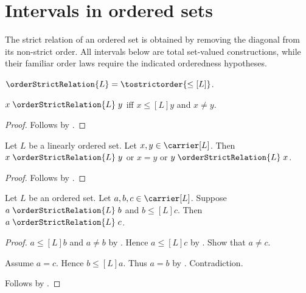 \section{Intervals in ordered sets}



The strict relation of an ordered set is obtained by removing the diagonal
from its non-strict order.  All intervals below are total set-valued
constructions, while their familiar order laws require the indicated
orderedness hypotheses.

\begin{definition}\label{ordered_set_strict_relation}
    $\orderStrictRelation{L}=\tostrictorder{\leq[L]}$.
\end{definition}

\begin{proposition}\label{ordered_set_strict_relation_iff}
    $x\mathrel{\orderStrictRelation{L}}y$ iff
        $x\mathrel{\leq[L]}y$ and $x\neq y$.
\end{proposition}
\begin{proof}
    Follows by
        .
\end{proof}

\begin{proposition}\label{linearly_ordered_set_strict_trichotomy}
    Let $L$ be a linearly ordered set.
    Let $x,y\in\carrier[L]$.
    Then $x\mathrel{\orderStrictRelation{L}}y$ or $x=y$ or
        $y\mathrel{\orderStrictRelation{L}}x$.
\end{proposition}
\begin{proof}
    Follows by
        .
\end{proof}

\begin{proposition}\label{ordered_set_strict_le_transitive}
    Let $L$ be an ordered set.
    Let $a,b,c\in\carrier[L]$.
    Suppose $a\mathrel{\orderStrictRelation{L}}b$ and
        $b\mathrel{\leq[L]}c$.
    Then $a\mathrel{\orderStrictRelation{L}}c$.
\end{proposition}
\begin{proof}
    $a\mathrel{\leq[L]}b$ and $a\neq b$ by
        .
    Hence $a\mathrel{\leq[L]}c$ by
        .
    Show that $a\neq c$.
    \begin{subproof}
        Assume $a=c$.
        Hence $b\mathrel{\leq[L]}a$.
        Thus $a=b$ by
            .
        Contradiction.
    \end{subproof}
    Follows by .
\end{proof}

